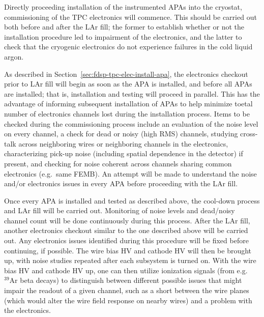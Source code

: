 Directly proceeding installation of the instrumented APAs into the cryostat, commissioning of the
TPC electronics will commence.  This should be carried out both before and after the LAr fill;
the former to establish whether or not the installation procedure led to impairment of the
electronics, and the latter to check that the cryogenic electronics do not experience failures
in the cold liquid argon.

As described in Section~\ref{sec:fdsp-tpc-elec-install-apa}, the electronics checkout prior to
LAr fill will begin as soon as the APA is installed, and before all APAs are installed; that is,
installation and testing will proceed in parallel.  This has the advantage of informing
subsequent installation of APAs to help minimize toetal number of electronics channels lost
during the installation process.  Items to be checked during the commissioning process include
an evaluation of the noise level on every channel, a check for dead or noisy (high RMS) channels,
studying cross-talk across neighboring wires or neighboring channels in the electronics,
characterizing pick-up noise (including spatial dependence in the detector) if present, and
checking for noise coherent across channels sharing common electronics (e.g.~same FEMB).  An
attempt will be made to understand the noise and/or electronics issues in every APA before
proceeding with the LAr fill.

Once every APA is installed and tested as described above, the cool-down process and LAr fill
will be carried out.  Monitoring of noise levels and dead/noisy channel count will be
done continuously during this process.  After the LAr fill, another electronics checkout
similar to the one described above will be carried out.  Any electronics issues identified
during this procedure will be fixed before continuing, if possible.  The wire bias HV and
cathode HV will then be brought up, with noise studies repeated after each subsystem is
turned on.  With the wire bias HV and cathode HV up, one can then utilize ionization signals
(from e.g.~$\mathrm{{}^{39}Ar}$ beta decays) to distinguish between different possible issues
that might impair the readout of a given channel, such as a short between the wire planes
(which would alter the wire field response on nearby wires) and a problem with the electronics.

